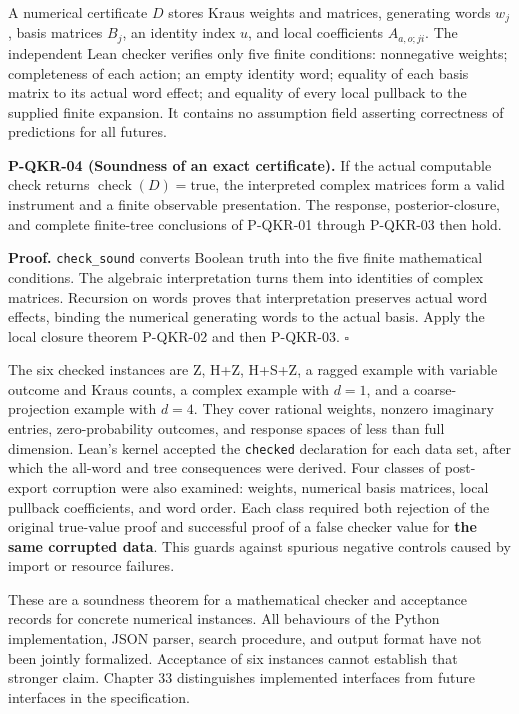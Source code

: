 \documentclass[
  11pt,
  oneside]{book}
\begin{document}
A numerical certificate \(D\) stores Kraus weights and matrices,
generating words \(w_j\), basis matrices \(B_j\), an identity index
\(u\), and local coefficients \(A_{a,o;ji}\). The independent Lean
checker verifies only five finite conditions: nonnegative weights;
completeness of each action; an empty identity word; equality of each
basis matrix to its actual word effect; and equality of every local
pullback to the supplied finite expansion. It contains no assumption
field asserting correctness of predictions for all futures.

\label{p-qkr-04}{}

\textbf{P-QKR-04 (Soundness of an exact certificate).} If the actual
computable check returns \(\operatorname{check}(D)=\mathrm{true}\), the
interpreted complex matrices form a valid instrument and a finite
observable presentation. The response, posterior-closure, and complete
finite-tree conclusions of P-QKR-01 through P-QKR-03 then hold.

\textbf{Proof.} \texttt{check\_\allowbreak sound} converts Boolean truth into the
five finite mathematical conditions. The algebraic interpretation turns
them into identities of complex matrices. Recursion on words proves that
interpretation preserves actual word effects, binding the numerical
generating words to the actual basis. Apply the local closure theorem
P-QKR-02 and then P-QKR-03. \(\square\)

The six checked instances are Z, H+Z, H+S+Z, a ragged example with
variable outcome and Kraus counts, a complex example with \(d=1\), and a
coarse-projection example with \(d=4\). They cover rational weights,
nonzero imaginary entries, zero-probability outcomes, and response
spaces of less than full dimension. Lean's kernel accepted the
\texttt{checked} declaration for each data set, after which the all-word
and tree consequences were derived. Four classes of post-export
corruption were also examined: weights, numerical basis matrices, local
pullback coefficients, and word order. Each class required both
rejection of the original true-value proof and successful proof of a
false checker value for \textbf{the same corrupted data}. This guards
against spurious negative controls caused by import or resource
failures.

These are a soundness theorem for a mathematical checker and acceptance
records for concrete numerical instances. All behaviours of the Python
implementation, JSON parser, search procedure, and output format have
not been jointly formalized. Acceptance of six instances cannot
establish that stronger claim. Chapter 33 distinguishes implemented
interfaces from future interfaces in the specification.
\end{document}
